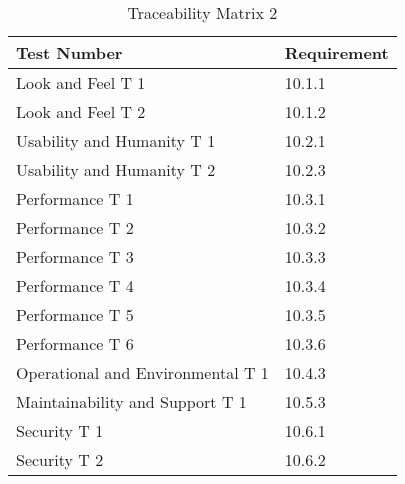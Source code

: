 \documentclass[12pt, titlepage]{article}
\begin{document}
\begin{table}[H]
	\caption{Traceability Matrix 2} \label{TraceMatrix2}
	\begin{tabular}{ll}
		\toprule
		\textbf{Test Number} & \textbf{Requirement} \\
		\midrule
		Look and Feel T 1 & 10.1.1\\
		Look and Feel T 2 & 10.1.2\\
		\midrule
		Usability and Humanity T 1 & 10.2.1\\
		Usability and Humanity T 2 & 10.2.3\\
		\midrule
		Performance T 1 & 10.3.1\\
		Performance T 2 & 10.3.2\\
		Performance T 3 & 10.3.3\\
		Performance T 4 & 10.3.4\\
		Performance T 5 & 10.3.5\\
		Performance T 6 & 10.3.6\\
		\midrule
		Operational and Environmental T 1 & 10.4.3\\
		\midrule
		Maintainability and Support T 1 & 10.5.3\\
		\midrule
		Security T 1 & 10.6.1\\
		Security T 2 & 10.6.2\\
		\bottomrule
	\end{tabular}
\end{table}
\end{document}
